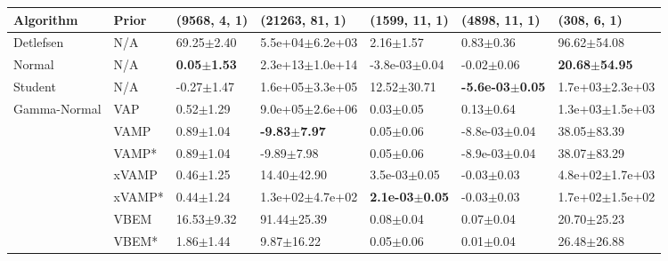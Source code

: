 \begin{tabular}{lllllll}
Algorithm & Prior& (9568, 4, 1)& (21263, 81, 1)& (1599, 11, 1)& (4898, 11, 1)& (308, 6, 1)\\
\midrule
Detlefsen & N/A &          69.25$\pm$2.40 &      5.5e+04$\pm$6.2e+03 &              2.16$\pm$1.57 &               0.83$\pm$0.36 &           96.62$\pm$54.08 \\
Normal & N/A &  \textbf{0.05$\pm$1.53} &      2.3e+13$\pm$1.0e+14 &          -3.8e-03$\pm$0.04 &              -0.02$\pm$0.06 &  \textbf{20.68$\pm$54.95} \\
Student & N/A &          -0.27$\pm$1.47 &      1.6e+05$\pm$3.3e+05 &            12.52$\pm$30.71 &  \textbf{-5.6e-03$\pm$0.05} &       1.7e+03$\pm$2.3e+03 \\
Gamma-Normal & VAP &           0.52$\pm$1.29 &      9.0e+05$\pm$2.6e+06 &              0.03$\pm$0.05 &               0.13$\pm$0.64 &       1.3e+03$\pm$1.5e+03 \\
             & VAMP &           0.89$\pm$1.04 &  \textbf{-9.83$\pm$7.97} &              0.05$\pm$0.06 &           -8.8e-03$\pm$0.04 &           38.05$\pm$83.39 \\
             & VAMP* &           0.89$\pm$1.04 &           -9.89$\pm$7.98 &              0.05$\pm$0.06 &           -8.9e-03$\pm$0.04 &           38.07$\pm$83.29 \\
             & xVAMP &           0.46$\pm$1.25 &          14.40$\pm$42.90 &           3.5e-03$\pm$0.05 &              -0.03$\pm$0.03 &       4.8e+02$\pm$1.7e+03 \\
             & xVAMP* &           0.44$\pm$1.24 &      1.3e+02$\pm$4.7e+02 &  \textbf{2.1e-03$\pm$0.05} &              -0.03$\pm$0.03 &       1.7e+02$\pm$1.5e+02 \\
             & VBEM &          16.53$\pm$9.32 &          91.44$\pm$25.39 &              0.08$\pm$0.04 &               0.07$\pm$0.04 &           20.70$\pm$25.23 \\
             & VBEM* &           1.86$\pm$1.44 &           9.87$\pm$16.22 &              0.05$\pm$0.06 &               0.01$\pm$0.04 &           26.48$\pm$26.88 \\
\bottomrule
\end{tabular}

